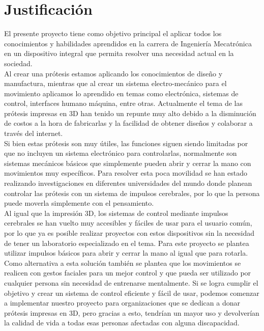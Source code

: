 \chapter{Justificación}

El presente proyecto tiene como objetivo principal el aplicar todos los conocimientos y habilidades aprendidos en la carrera de Ingeniería Mecatrónica en un dispositivo integral que permita resolver una necesidad actual en la sociedad. \\
Al crear una prótesis estamos aplicando los conocimientos de diseño y manufactura, mientras que al crear un sistema electro-mecánico para el movimiento aplicamos lo aprendido en temas como electrónica, sistemas de control, interfaces humano máquina, entre otras. Actualmente el tema de las prótesis impresas en 3D han tenido un repunte muy alto debido a la disminución de costos a la hora de fabricarlas y la facilidad de obtener diseños y colaborar a través del internet. \\
Si bien estas prótesis son muy útiles, las funciones siguen siendo limitadas por que no incluyen un sistema electrónico para controlarlas, normalmente son sistemas mecánicos básicos que simplemente pueden abrir y cerrar la mano con movimientos muy específicos.  Para resolver esta poca movilidad se han estado realizando investigaciones en diferentes universidades del mundo donde planean controlar las prótesis con un sistema de impulsos cerebrales, por lo que la persona puede moverla simplemente con el pensamiento. \\
Al igual que la impresión 3D, los sistemas de control mediante impulsos cerebrales se han vuelto muy accesibles y fáciles de usar para el usuario común, por lo que ya es posible realizar proyectos con estos dispositivos sin la necesidad de tener un laboratorio especializado en el tema. Para este proyecto se plantea utilizar impulsos básicos para abrir y cerrar la mano al igual que para rotarla.  Como alternativa a esta solución también se plantea que los movimientos se realicen con gestos faciales para un mejor control y que pueda ser utilizado por cualquier persona sin necesidad de entrenarse mentalmente. Si se logra cumplir el objetivo y crear un sistema de control eficiente y fácil de usar, podemos comenzar a implementar nuestro proyecto para organizaciones que se dedican a donar prótesis impresas en 3D, pero gracias a esto, tendrían un mayor uso y devolverían la calidad de vida a todas esas personas afectadas con alguna discapacidad.
